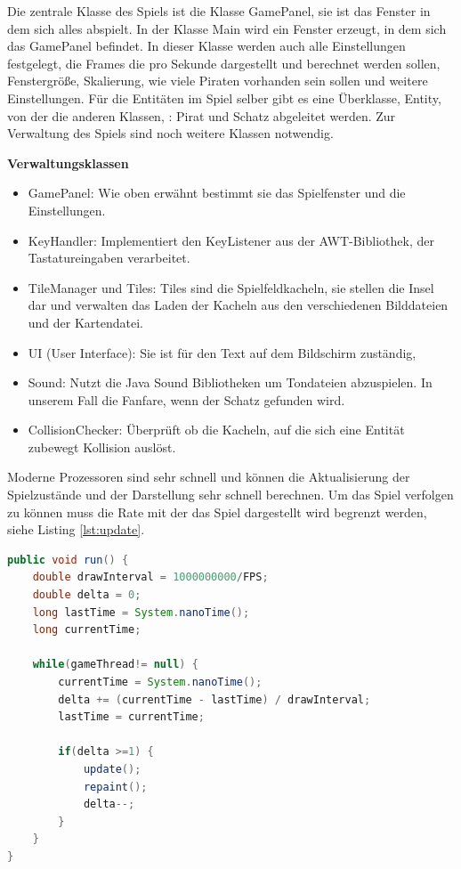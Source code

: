 \documentclass[
	12pt, %
	a4paper,
	listof=totoc, %
	bibliography=totoc, %
	numbers=noenddot, %
	ngerman, %
	headsepline, %
	oneside %
	]{scrbook} %
\begin{document}
Die zentrale Klasse des Spiels ist die Klasse GamePanel, sie ist das Fenster in dem sich alles abspielt. In der Klasse Main wird ein Fenster erzeugt, in dem sich das GamePanel befindet. In dieser Klasse werden auch alle Einstellungen festgelegt, die Frames die pro Sekunde dargestellt und berechnet werden sollen, Fenstergröße, Skalierung, wie viele Piraten vorhanden sein sollen und weitere Einstellungen.  
Für die Entitäten im Spiel selber gibt es eine Überklasse, Entity, von der die anderen Klassen, : Pirat und Schatz abgeleitet werden.  
Zur Verwaltung des Spiels sind noch weitere Klassen notwendig.

\textbf{Verwaltungsklassen}
\begin{itemize}\vspace{-1em}
\setlength{\itemsep}{-1em}
	\item GamePanel: Wie oben erwähnt bestimmt sie das Spielfenster und die Einstellungen.
	\item KeyHandler: Implementiert den KeyListener aus der AWT-Bibliothek, der Tastatureingaben verarbeitet.
	\item TileManager und Tiles: Tiles sind die Spielfeldkacheln, sie stellen die Insel dar und verwalten das Laden der Kacheln aus den verschiedenen Bilddateien und der Kartendatei.
	\item UI (User Interface): Sie ist für den Text auf dem Bildschirm zuständig,
	\item Sound: Nutzt die Java Sound Bibliotheken um Tondateien abzuspielen. In unserem Fall die Fanfare, wenn der Schatz gefunden wird.
	\item CollisionChecker: Überprüft ob die Kacheln, auf die sich eine Entität zubewegt Kollision auslöst.
\end{itemize}

Moderne Prozessoren sind sehr schnell und können die Aktualisierung der Spielzustände und der Darstellung sehr schnell berechnen. Um das Spiel verfolgen zu können muss die Rate mit der das Spiel dargestellt wird begrenzt werden, siehe Listing \ref{lst:update}.

\begin{lstlisting}[language=Java, caption=Beschränkung der Aktualisierungen, label={lst:update}]
public void run() {
	double drawInterval = 1000000000/FPS;
	double delta = 0;
	long lastTime = System.nanoTime();
	long currentTime;
	
	while(gameThread!= null) {
		currentTime = System.nanoTime();
		delta += (currentTime - lastTime) / drawInterval;
		lastTime = currentTime;
		
		if(delta >=1) {
			update();
			repaint();
			delta--;
		}
	}
}
\end{lstlisting}
\end{document}
